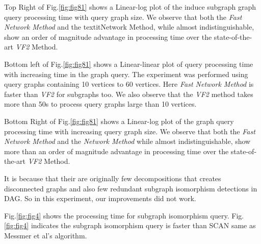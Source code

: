 Top Right of Fig.\ref{fig:fig81} shows a Linear-log plot of the induce subgraph graph query processing time with query graph size. We observe that both the \textit{Fast Network Method} and the textit{Network Method}, while almost indistinguishable, show an order of magnitude advantage in processing time over the state-of-the-art \textit{VF2} Method. 

Bottom left of Fig.\ref{fig:fig81} shows a Linear-linear plot of  query processing time with increasing  time in the  graph query. The experiment was performed using query graphs containing 10 vertices to 60 vertices. Here \textit{Fast Network Method} is faster than \textit{VF2} for subgraphs too. We also observe that the \textit{VF2} method takes more than 50s to process query graphs large than 10 vertices. 

Bottom Right of Fig.\ref{fig:fig81} shows a Linear-log plot of the graph query processing time with increasing query graph size. We observe that both the \textit{Fast Network Method} and the \textit{Network Method} while almost indistinguishable, show more than an order of magnitude advantage in processing time over the state-of-the-art \textit{VF2} Method.

It is because that their are originally few decompositions that creates disconnected graphs and also few redundant subgraph isomorphism detections in DAG.
So in this experiment, our improvements did not work.

Fig.\ref{fig:fig4} shows the processing time for subgraph isomorphism query.
Fig.\ref{fig:fig4} indicates the subgraph isomorphism query is faster than SCAN same as Messmer et al's algorithm.

